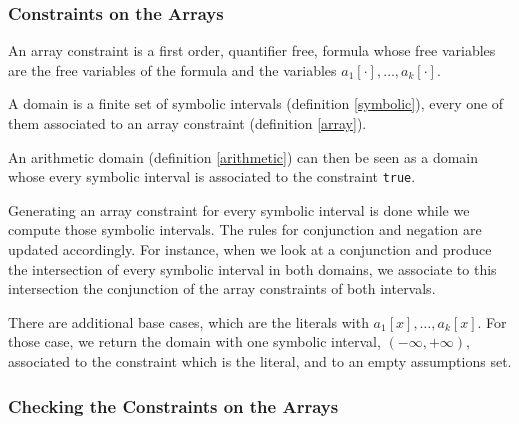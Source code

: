 \documentclass[]{article}
\begin{document}
{\begin{example}
\end{example}

\subsubsection{Constraints on the Arrays}

\begin{definition}

An array constraint is a first order, quantifier free, formula whose
free variables are the free variables of the formula and the variables
$a_1[\cdot], \ldots, a_k[\cdot]$.

\label{array}

\end{definition}


\begin{definition}[Domain]

A domain is a finite set of symbolic intervals (definition
\ref{symbolic}), every one of them associated to an array constraint
(definition \ref{array}).

\label{domain}

\end{definition}

An arithmetic domain (definition \ref{arithmetic}) can then be seen as a
domain whose every symbolic interval is associated to the constraint
\texttt{true}.

Generating an array constraint for every symbolic interval is done while we compute those symbolic
intervals. The rules for conjunction and negation are updated accordingly. For instance, when we
look at a conjunction and produce the intersection of every symbolic interval in both domains, we
associate to this intersection the conjunction of the array constraints of both intervals.

There are additional base cases, which are the literals with $a_1[x], \ldots, a_k[x]$. For those
case, we return the domain with one symbolic interval, $(-\infty, +\infty)$, associated to the
constraint which is the literal, and to an empty assumptions set.

\subsubsection{Checking the Constraints on the Arrays}

}
\end{document}
